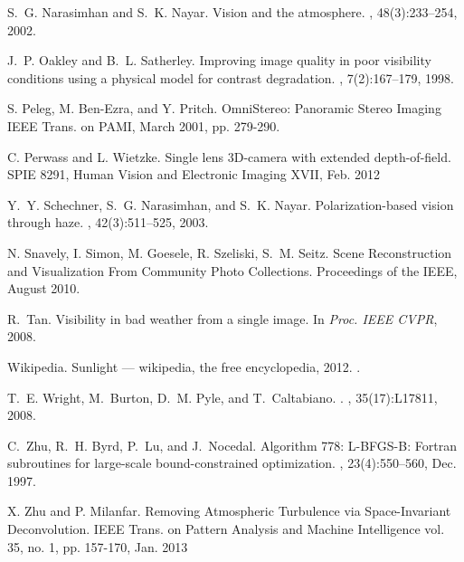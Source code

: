 \documentclass[10pt,twocolumn,letterpaper]{article}
\begin{document}
{\begin{thebibliography}{10}
S.~G. Narasimhan and S.~K. Nayar.
\newblock Vision and the atmosphere.
, 48(3):233--254,  2002.

J.~P. Oakley and B.~L. Satherley.
\newblock Improving image quality in poor visibility conditions using a
  physical model for contrast degradation.
, 7(2):167--179, 1998.

S. Peleg, M. Ben-Ezra, and Y. Pritch.
\newblock OmniStereo: Panoramic Stereo Imaging
\newblock IEEE Trans. on PAMI, March 2001, pp. 279-290.

C. Perwass and L. Wietzke.
\newblock Single lens 3D-camera with extended depth-of-field.
\newblock SPIE 8291, Human Vision and Electronic Imaging XVII, Feb. 2012

Y.~Y. Schechner, S.~G. Narasimhan, and S.~K. Nayar.
\newblock Polarization-based vision through haze.
, 42(3):511--525, 2003.

\newblock N. Snavely, I. Simon, M. Goesele, R. Szeliski, S.~M. Seitz.
\newblock Scene Reconstruction and Visualization From Community Photo Collections. Proceedings of the IEEE, August 2010.

R.~Tan.
\newblock Visibility in bad weather from a single image.
\newblock In {\em Proc. IEEE CVPR}, 2008.

Wikipedia.
\newblock Sunlight --- wikipedia{,} the free encyclopedia, 2012.
.

T.~E. Wright, M.~Burton, D.~M. Pyle, and T.~Caltabiano.
.
, 35(17):L17811, 2008.

C.~Zhu, R.~H. Byrd, P.~Lu, and J.~Nocedal.
\newblock Algorithm 778: L-BFGS-B: Fortran subroutines for large-scale
  bound-constrained optimization.
, 23(4):550--560, Dec. 1997.

X. Zhu and P. Milanfar.
\newblock Removing Atmospheric Turbulence via Space-Invariant Deconvolution.
\newblock IEEE Trans. on Pattern Analysis and Machine Intelligence vol. 35, no. 1, pp. 157-170, Jan. 2013 

\end{thebibliography}

}
\end{document}
